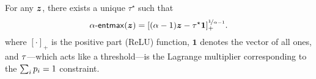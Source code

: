 \begin{lemma}
    \label{lemma:tsallis_reduction}%
    For any $\bm{z}$, there exists a unique $\tau^\star$ such that
    \begin{equation}\label{eq:entmax_form}
        \mathop{\mathsf{\alpha}\textnormal{-}\mathsf{entmax}}(\bm{z})
        = [(\alpha - 1){\bm{z}} - \tau^\star \bm{1}]_+^{\nicefrac{1}{\alpha-1}}.
    \end{equation}
    where $[\cdot]_+$ is the positive part (ReLU) function, $\bm{1}$
    denotes the vector of all ones, and $\tau$---which acts like a
    threshold---is the Lagrange multiplier corresponding to the $\sum_i
        p_i=1$ constraint.
\end{lemma}

